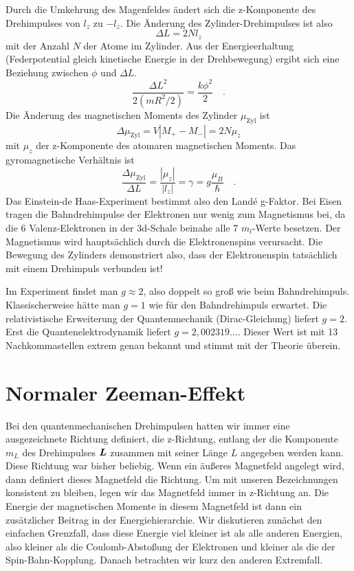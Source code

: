 Durch die Umkehrung des Magenfeldes ändert sich die z-Komponente des Drehimpulses von $l_z$ zu $-l_z$. Die Änderung des Zylinder-Drehimpulses ist also 
\begin{equation}
    \Delta L = 2 N l_z
\end{equation}
mit der Anzahl $N$ der Atome im Zylinder. Aus der Energieerhaltung (Federpotential gleich kinetische Energie in der Drehbewegung) ergibt sich eine Beziehung zwischen $\phi$ und $\Delta L$.
\begin{equation}
\frac{\Delta L ^2}{2 (mR^2/2)} = \frac{k \phi^2}{2}    \quad .  
\end{equation}
Die Änderung des magnetischen  Moments des Zylinder $\mu_\text{Zyl}$ ist
\begin{equation}
   \Delta  \mu_\text{Zyl} = V | M_+ - M_-| = 2 N \mu_z
\end{equation}
mit $\mu_z$ der z-Komponente des atomaren magnetischen Moments. Das gyromagnetische Verhältnis ist
\begin{equation}
    \frac{ \Delta  \mu_\text{Zyl}}{\Delta L}
    = \frac{|\mu_z|}{|l_z|} = \gamma = g \frac{\mu_B}{\hbar}  \quad .
\end{equation}
Das Einstein-de Haas-Experiment bestimmt also den Landé g-Faktor. Bei Eisen tragen die Bahndrehimpulse der Elektronen nur wenig zum Magnetismus bei, da die 6 Valenz-Elektronen in der  3d-Schale beinahe alle 7 $m_l$-Werte besetzen. 
Der Magnetismus wird hauptsächlich durch die Elektronenspins verursacht. Die Bewegung des Zylinders demonstriert also, dass der Elektronenspin tatsächlich mit einem Drehimpuls verbunden ist! 

Im Experiment findet man $g \approx 2$, also doppelt so groß wie beim Bahndrehimpuls. Klassischerweise hätte man $g=1$ wie für den Bahndrehimpuls erwartet. Die relativistische Erweiterung der Quantenmechanik (Dirac-Gleichung) liefert $g=2$. Erst die Quantenelektrodynamik liefert $g=2,002319\dots$. Dieser Wert ist mit 13 Nachkommastellen extrem genau bekannt und stimmt mit der Theorie überein.


\section{Normaler Zeeman-Effekt}

Bei den quantenmechanischen Drehimpulsen hatten wir immer eine ausgezeichnete Richtung definiert, die z-Richtung, entlang der die Komponente $m_L$ des Drehimpulses $\boldsymbol{L}$ zusammen mit seiner Länge $L$ angegeben werden kann. Diese Richtung war bisher beliebig. Wenn ein äußeres Magnetfeld angelegt wird, dann definiert dieses Magnetfeld die Richtung. Um mit unseren Bezeichnungen konsistent zu bleiben, legen wir das Magnetfeld immer in z-Richtung an. Die Energie der magnetischen Momente in diesem Magnetfeld ist dann ein zusätzlicher Beitrag in der Energiehierarchie. Wir diskutieren zunächst den einfachen Grenzfall, dass diese Energie viel kleiner ist als alle anderen Energien, also kleiner als die Coulomb-Abstoßung  der Elektronen und kleiner als die der Spin-Bahn-Kopplung. Danach betrachten wir kurz den anderen Extremfall.

